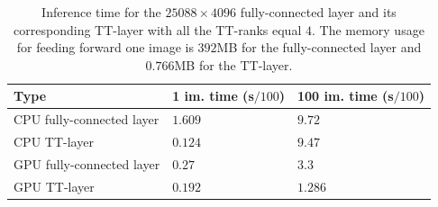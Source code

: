 \begin{table}
    \begin{center}
    \begin{tabular}{l| l l}
    Type & 1 im. time (s$/100$) & 100 im. time (s$/100$) \rule{0pt}{1.0\normalbaselineskip}\\ \hline
    CPU fully-connected layer   & $1.609$ & $9.72$ \rule{0pt}{1.0\normalbaselineskip}\\
    CPU TT-layer   & $0.124$ & $9.47$\\
    GPU fully-connected layer   & $0.27$ & $3.3$\\
    GPU TT-layer   & $0.192$ & $1.286$\\
    \end{tabular}
    \end{center}
    \caption{Inference time for the $25088 \times 4096$ fully-connected layer and its corresponding TT-layer with all the TT-ranks equal $4$. The memory usage for feeding forward one image is $392$MB for the fully-connected layer and $0.766$MB for the TT-layer. \label{tbl:imegenet-inference} \vspace{-0.5cm}}
\end{table}


